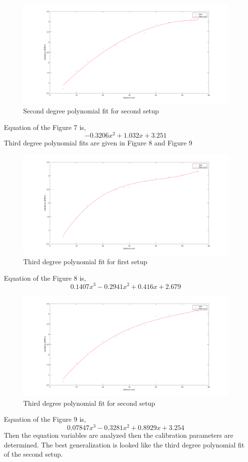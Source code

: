 \documentclass[letterpaper,12pt]{article}
\begin{document}
\begin{figure}[H]
	\centering
   \includegraphics[width=1\textwidth]{2closed_fit.png}
   \caption{Second degree polynomial fit for second setup}
\end{figure} 
Equation of the Figure 7 is,
\[-0.3206 x^2 + 1.032x + 3.251\]
Third degree polynomial fits are given in Figure 8 and Figure 9
\begin{figure}[H]
	\centering
   \includegraphics[width=1\textwidth]{open_fit.png}
   \caption{Third degree polynomial fit for first setup}
\end{figure} 
Equation of the Figure 8 is,
\[0.1407 x^3 -0.2941 x^2 +0.416 x + 2.679\]
\begin{figure}[H]
	\centering
   \includegraphics[width=1\textwidth]{closed_fit.png}
   \caption{Third degree polynomial fit for second setup}
\end{figure} 
Equation of the Figure 9 is,
\[0.07847 x^3 -0.3281 x^2 + 0.8929x + 3.254\]
Then the equation variables are analyzed then the calibration parameters are determined. The best generalization is looked like the third degree polynomial fit of the second setup.
\end{document}
